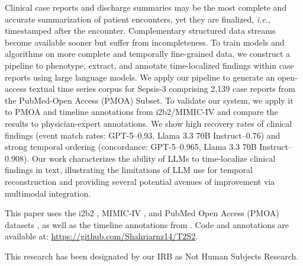 \begin{ChSixAbstract}
Clinical case reports and discharge summaries may be the most complete and accurate summarization of patient encounters, yet they are finalized, \emph{i.e.}, timestamped after the encounter.
Complementary structured data streams become available sooner but suffer from incompleteness.
To train models and algorithms on more complete and temporally fine-grained data, we construct a pipeline to phenotype, extract, and annotate time-localized findings within case reports using large language models.
We apply our pipeline to generate an open-access textual time series corpus for Sepsis-3 comprising 2,139 case reports from the PubMed-Open Access (PMOA) Subset.
To validate our system, we apply it to PMOA and timeline annotations from i2b2/MIMIC-IV and compare the results to physician-expert annotations.
We show high recovery rates of clinical findings (event match rates: GPT-5--0.93, Llama 3.3 70B Instruct--0.76) and strong temporal ordering (concordance: GPT-5--0.965, Llama 3.3 70B Instruct--0.908). 
Our work characterizes the ability of LLMs to time-localize clinical findings in text, illustrating the limitations of LLM use for temporal reconstruction and providing several potential avenues of improvement via multimodal integration.
\end{ChSixAbstract}


This paper uses the i2b2 \citep{sun2013evaluating}, MIMIC-IV \citep{ch06:johnson2023mimic}, and PubMed Open Access (PMOA) datasets \citep{pmc2024open}, as well as the timeline annotations from \cite{ch06:frattallone2024using}.
Code and annotations are available at: \url{https://github.com/Shahriarnz14/T2S2}.

This research has been designated by our IRB as Not Human Subjects Research.

